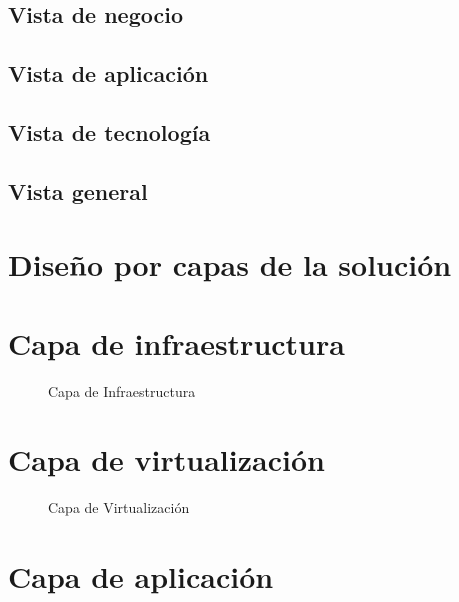 \subsection{Vista de negocio}


\subsection{Vista de aplicación}
%

\subsection{Vista de tecnología}


\subsection{Vista general}
%

\section{Diseño por capas de la solución}

\section{Capa de infraestructura}

\begin{figure}[H]
	\centering
	\caption{Capa de Infraestructura}
\end{figure}

\section{Capa de virtualización}

\begin{figure}[H]
	\centering
	\caption{Capa de Virtualización}
\end{figure}

\section{Capa de aplicación}

